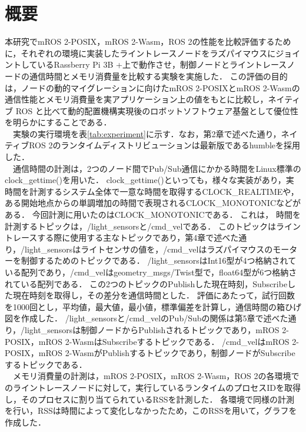 \section{概要}
本研究でmROS 2-POSIX，mROS 2-Wasm，ROS 2の性能を比較評価するために，それぞれの環境に実装したライントレースノードをラズパイマウスにジョイントしているRassberry Pi 3B +上で動作させ，制御ノードとライントレースノードの通信時間とメモリ消費量を比較する実験を実施した．
この評価の目的は，ノードの動的マイグレーションに向けたmROS 2-POSIXとmROS 2-Wasmの通信性能とメモリ消費量を実アプリケーション上の値をもとに比較し，ネイティブ ROS と比べて動的配置機構実現後のロボットソフトウェア基盤として優位性を明らかにすることである．
\\　実験の実行環境を表\ref{tab:experiment}に示す．なお，第2章で述べた通り，ネイティブROS 2のランタイムディストリビューションは最新版であるhumbleを採用した．
\\　通信時間の計測は，2つのノード間でPub/Sub通信にかかる時間をLinux標準のclock\_gettime()を用いた．
clock\_gettime()といっても，様々な実装があり，実時間を計測するシステム全体で一意な時間を取得するCLOCK\_REALTIMEや，ある開始地点からの単調増加の時間で表現されるCLOCK\_MONOTONICなどがある．
今回計測に用いたのはCLOCK\_MONOTONICである．
これは，
時間を計測するトピックは，/light\_sensorsと/cmd\_velである．
このトピックはライントレースする際に使用する主なトピックであり，第4章で述べた通り，/light\_sensorsはライトセンサの値を，/cmd\_velはラズパイマウスのモーターを制御するためのトピックである．
/light\_sensorsはInt16型が4つ格納されている配列であり，/cmd\_velはgeometry\_msgs/Twist型で，float64型が6つ格納されている配列である．
この2つのトピックのPublishした現在時刻，Subscribeした現在時刻を取得し，その差分を通信時間とした．
評価にあたって，試行回数を1000回とし，平均値，最大値，最小値，標準偏差を計算し，通信時間の箱ひげ図を作成した．
/light\_sensorsと/cmd\_velのPub/Subの関係は第5章で述べた通り，/light\_sensorsは制御ノードからPublishされるトピックであり，mROS 2-POSIX，mROS 2-WasmはSubscribeするトピックである．
/cmd\_velはmROS 2-POSIX，mROS 2-WasmがPublishするトピックであり，制御ノードがSubscribeするトピックである．
\\　メモリ消費量の計測は，mROS 2-POSIX，mROS 2-Wasm，ROS 2の各環境でのライントレースノードに対して，実行しているランタイムのプロセスIDを取得し，そのプロセスに割り当てられているRSSを計測した．
各環境で同様の計測を行い，RSSは時間によって変化しなかったため，このRSSを用いて，グラフを作成した．
